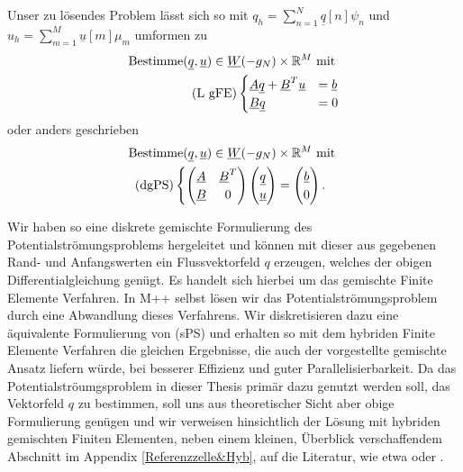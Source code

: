 Unser zu lösendes Problem lässt sich so mit $ q_h = \sum_{n=1}^{N} \underline{q}[n] \psi_n $ und $ u_h = \sum_{m=1}^{M} \underline{u}[m] \mu_m $ umformen zu 
\begin{align*}
\text{Bestimme} (\underline{q},\underline{u}) \in \underline{W}(-g_N)\times \mathbb{R}^M \text{ mit }\\
\text{(L gFE)}\begin{cases}
\underline{A} \underline{q} + \underline{B}^T \underline{u} &= \underline{b} \\
\underline{B} \underline{q} &= 0
\end{cases}
\end{align*}
oder anders geschrieben 
\begin{align*}
\text{Bestimme} (\underline{q},\underline{u}) \in \underline{W}(-g_N)\times \mathbb{R}^M \text{ mit }\\
\text{(dgPS)}\begin{cases}
\begin{pmatrix}
\underline{A} &\underline{B}^T\\
\underline{B} &0
\end{pmatrix}
\begin{pmatrix}
\underline{q} \\
\underline{u} 
\end{pmatrix}
=
\begin{pmatrix}
\underline{b}\\
0
\end{pmatrix}.
\end{cases}
\end{align*}

Wir haben so eine diskrete gemischte Formulierung des Potentialströmungsproblems hergeleitet und können mit dieser aus gegebenen Rand- und Anfangswerten ein Flussvektorfeld $q$ erzeugen, welches der obigen Differentialgleichung genügt.
Es handelt sich hierbei um das gemischte Finite Elemente Verfahren. In M++ selbst lösen wir das Potentialströmungsproblem durch eine Abwandlung dieses Verfahrens. Wir diskretisieren dazu eine äquivalente Formulierung von (sPS) und erhalten so mit dem hybriden Finite Elemente Verfahren die gleichen Ergebnisse, die auch der vorgestellte gemischte Ansatz liefern würde, bei besserer Effizienz und guter Parallelisierbarkeit. Da das Potentialströumgsproblem in dieser Thesis primär dazu genutzt werden soll, das Vektorfeld $q$ zu bestimmen, soll uns aus theoretischer Sicht aber obige Formulierung genügen und wir verweisen hinsichtlich der Lösung mit hybriden gemischten Finiten Elementen, neben einem kleinen, Überblick verschaffendem Abschnitt im Appendix \ref{Referenzzelle&Hyb}, auf die Literatur, wie etwa \cite{brezzi2012mixed} oder  \cite{roberts1991mixed}.











